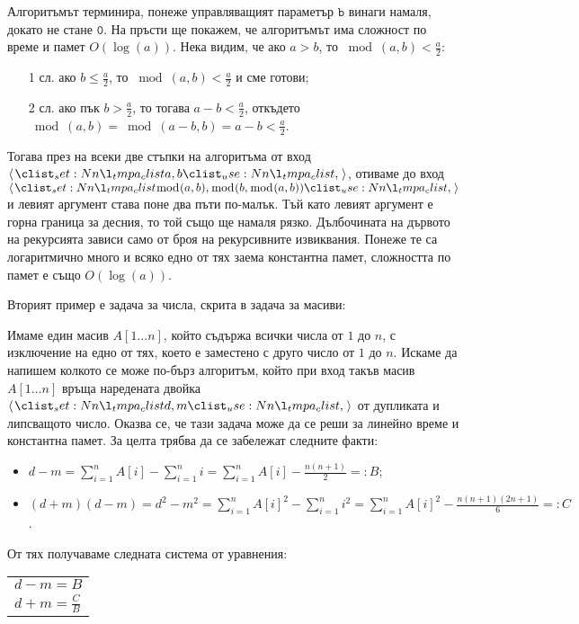 Алгоритъмът терминира, понеже управляващият параметър $\mathtt{b}$ винаги намаля, докато не стане $\mathtt{0}$.
На пръсти ще покажем, че алгоритъмът има сложност по време и памет $O(\log(a))$.
Нека видим, че ако $a > b$, то $\bmod(a, b) < \frac{a}{2}$:
\begin{itemize}
  \item[1 сл.] ако $b \leq \frac{a}{2}$, то $\bmod(a, b) < \frac{a}{2}$ и сме готови;
  \item[2 сл.] ако пък $b > \frac{a}{2}$, то тогава $a - b < \frac{a}{2}$, откъдето $\bmod(a, b) = \bmod(a - b, b) = a - b < \frac{a}{2}$.
\end{itemize}
Тогава през на всеки две стъпки на алгоритъма от вход $\opair{a, b}$, отиваме до вход $\opair{\bmod(a, b), \bmod(b, \bmod(a, b))}$ и левият аргумент става поне два пъти по-малък.
Тъй като левият аргумент е горна граница за десния, то той също ще намаля рязко.
Дълбочината на дървото на рекурсията зависи само от броя на рекурсивните извиквания.
Понеже те са логаритмично много и всяко едно от тях заема константна памет, сложността по памет е също $O(\log(a))$.

Вторият пример е задача за числа, скрита в задача за масиви:

Имаме един масив $A[1 \dots n]$, който съдържа всички числа от $1$ до $n$, с изключение на едно от тях, което е заместено с друго число от $1$ до $n$.
Искаме да напишем колкото се може по-бърз алгоритъм, който при вход такъв масив $A[1 \dots n]$ връща наредената двойка $\opair{d, m}$ от дупликата и липсващото число.
Оказва се, че тази задача може да се реши за линейно време и константна памет.
За целта трябва да се забележат следните факти:
\begin{itemize}
  \item $d - m = \sum\limits_{i = 1}^n A[i] - \sum\limits_{i = 1}^n i = \sum\limits_{i = 1}^n A[i] - \frac{n(n + 1)}{2} =: B$;
  \item $(d + m)(d - m) = d^2 - m^2 = \sum\limits_{i = 1}^n A[i]^2 - \sum\limits_{i = 1}^n i^2 = \sum\limits_{i = 1}^n A[i]^2 - \frac{n(n + 1)(2n + 1)}{6} =: C$.
\end{itemize}

От тях получаваме следната система от уравнения:
\begin{center}
  \begin{tabular}{|l}
    $d - m = B$ \\
    $d + m = \frac{C}{B}$
  \end{tabular}
\end{center}


